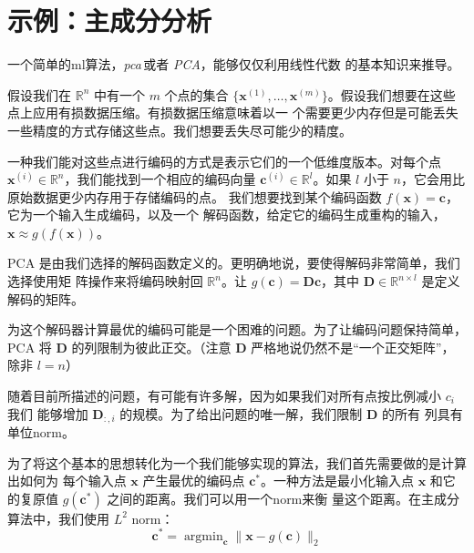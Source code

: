 \section{示例：主成分分析}
\label{sec:example:principal_components_analysis}

一个简单的\gls*{ml}算法，\emph{\gls{pca}}\,或者 \emph{PCA}，能够仅仅利用线性代数
的基本知识来推导。

假设我们在 $\mathbb{R}^n$ 中有一个 $m$ 个点的集合 $\{\pmb{x}^{(1)}, \ldots,
\pmb{x}^{(m)}\}$。假设我们想要在这些点上应用有损数据压缩。有损数据压缩意味着以一
个需要更少内存但是可能丢失一些精度的方式存储这些点。我们想要丢失尽可能少的精度。

一种我们能对这些点进行编码的方式是表示它们的一个低维度版本。对每个点
$\pmb{x}^{(i)} \in \mathbb{R}^n$，我们能找到一个相应的编码向量 $\pmb{c}^{(i)}
\in \mathbb{R}^l$。如果 $l$ 小于 $n$，它会用比原始数据更少内存用于存储编码的点。
我们想要找到某个编码函数 $f(\pmb{x}) = \pmb{c}$，它为一个输入生成编码，以及一个
解码函数，给定它的编码生成重构的输入，$\pmb{x} \approx g(f(\pmb{x}))$。

PCA 是由我们选择的解码函数定义的。更明确地说，要使得解码非常简单，我们选择使用矩
阵操作来将编码映射回 $\mathbb{R}^n$。让 $g(\pmb{c}) = \pmb{D}\pmb{c}$，其中
$\pmb{D} \in \mathbb{R}^{n \times l}$ 是定义解码的矩阵。

为这个解码器计算最优的编码可能是一个困难的问题。为了让编码问题保持简单，PCA 将
$\pmb{D}$ 的列限制为彼此正交。（注意 $\pmb{D}$ 严格地说仍然不是``一个正交矩阵''，
  除非 $l = n$）

随着目前所描述的问题，有可能有许多解，因为如果我们对所有点按比例减小 $c_i$ 我们
能够增加 $\pmb{D}_{:,i}$ 的规模。为了给出问题的唯一解，我们限制 $\pmb{D}$ 的所有
列具有单位\gls*{norm}。

为了将这个基本的思想转化为一个我们能够实现的算法，我们首先需要做的是计算出如何为
每个输入点 $\pmb{x}$ 产生最优的编码点 $\pmb{c}^*$。一种方法是最小化输入点
$\pmb{x}$ 和它的复原值 $g(\pmb{c}^*)$ 之间的距离。我们可以用一个\gls*{norm}来衡
量这个距离。在主成分算法中，我们使用 $L^2$ \gls*{norm}：
\begin{equation}
  \pmb{c}^* = \mathop{\arg\min}_{\pmb{c}}\|\pmb{x} - g(\pmb{c})\|_2
\end{equation}

